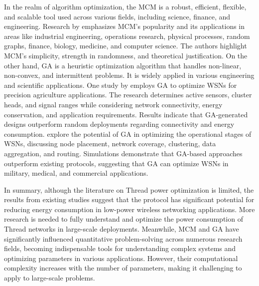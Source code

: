 In the realm of algorithm optimization, the \gls{MCM} is a robust, efficient, flexible, and scalable tool used across various fields, including science, finance, and engineering. Research by \textcite{kroese2014monte} emphasizes \gls{MCM}'s popularity and its applications in areas like industrial engineering, operations research, physical processes, random graphs, finance, biology, medicine, and computer science. The authors highlight \gls{MCM}'s simplicity, strength in randomness, and theoretical justification. On the other hand, \gls{GA} is a heuristic optimization algorithm that handles non-linear, non-convex, and intermittent problems. It is widely applied in various engineering and scientific applications. One study by \textcite{ferentinos2005energy} employs \gls{GA} to optimize \glspl{WSN} for precision agriculture applications. The research determines active sensors, cluster heads, and signal ranges while considering network connectivity, energy conservation, and application requirements. Results indicate that \gls{GA}-generated designs outperform random deployments regarding connectivity and energy consumption. \textcite{norouzi2014genetic} explore the potential of \gls{GA} in optimizing the operational stages of \glspl{WSN}, discussing node placement, network coverage, clustering, data aggregation, and routing. Simulations demonstrate that \gls{GA}-based approaches outperform existing protocols, suggesting that \gls{GA} can optimize \glspl{WSN} in military, medical, and commercial applications.

In summary, although the literature on Thread power optimization is limited, the results from existing studies suggest that the protocol has significant potential for reducing energy consumption in low-power wireless networking applications. More research is needed to fully understand and optimize the power consumption of Thread networks in large-scale deployments. Meanwhile, \gls{MCM} and \gls{GA} have significantly influenced quantitative problem-solving across numerous research fields, becoming indispensable tools for understanding complex systems and optimizing parameters in various applications. However, their computational complexity increases with the number of parameters, making it challenging to apply to large-scale problems.
